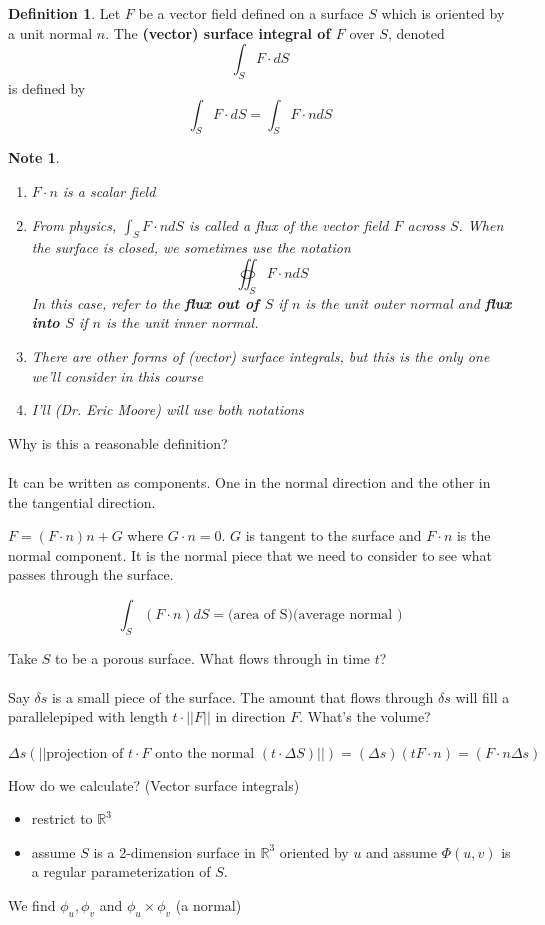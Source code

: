 \documentclass[12pt]{article}
\theoremstyle{plain}
\newtheorem*{note}{Note}
\theoremstyle{definition}
\newtheorem{definition}[theorem]{Definition}
\begin{document}
\begin{definition}
	Let $F$ be a vector field defined on a surface $S$ which is oriented by a unit normal $n$. The \textbf{(vector) surface integral of $F$} over $S$, denoted
	$$\int_S F \cdot dS$$
	is defined by
	$$\int_S F \cdot dS = \int_S F \cdot n dS$$
\end{definition}

\begin{note}
	\begin{enumerate}
		\item{$F \cdot n$ is a scalar field}
		\item{From physics, $\int_S F \cdot n dS$ is called a flux of the vector field $F$ across $S$. When the surface is closed, we sometimes use the notation
		$$\oiint_S F \cdot n dS $$
		In this case, refer to the \textbf{flux out of $S$} if $n$ is the unit outer normal and \textbf{flux into $S$} if $n$ is the unit inner normal.
		}
		\item{There are other forms of (vector) surface integrals, but this is the only one we'll consider in this course}
		\item{I'll (Dr. Eric Moore) will use both notations}
	\end{enumerate}
\end{note}

Why is this a reasonable definition?\\
\\
It can be written as components. One in the normal direction and the other in the tangential direction.

$F = (F \cdot n) n + G$ where $G \cdot n = 0$. $G$ is tangent to the surface and $F \cdot n$ is the normal component. It is the normal piece that we need to consider to see what passes through the surface.

$$\int_S (F \cdot n) dS = \text{(area of S)(average normal )}$$

Take $S$ to be a porous surface. What flows through in time $t$?\\
\\
Say $\delta s$ is a small piece of the surface. The amount that flows through $\delta s$ will fill a parallelepiped with length $t\cdot || F ||$ in direction $F$. What's the volume?\\
\\
$$\Delta s (||\text{projection of $t\cdot F$ onto the normal $(t\cdot \Delta S)$}||) = (\Delta s)(tF \cdot n) = (F \cdot n \Delta s)$$

How do we calculate? (Vector surface integrals)
\begin{itemize}
	\item{restrict to $\mathbb{R}^3$}
	\item{assume $S$ is a 2-dimension surface in $\mathbb{R}^3$ oriented by $u$ and assume $\Phi (u,v)$ is a regular parameterization of $S$.}
\end{itemize}
We find $\phi_u, \phi_v$ and $\phi_u \times \phi_v$ (a normal)
\end{document}
